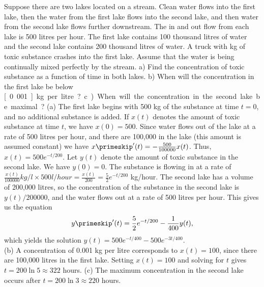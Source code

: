 {Suppose there are two lakes located on a stream.  Clean
water flows into the first lake,
then the water from the first lake flows into the second lake, and then
water from the second lake flows further downstream.
The in and out flow from each lake is 500 litres per hour.
The first lake contains 100 thousand litres of water and the
second lake contains 200 thousand litres of water.
A truck with \unit[500]{kg} of toxic substance
crashes into the first lake.  Assume that the water is being continually
mixed perfectly by the stream.  a) Find the concentration of toxic substance
as a function of time in both lakes.  b) When will the
concentration in the first lake be below \unit[0.001]{kg} per litre?
c) When will the
concentration in the second lake be maximal?}
{(a) The first lake begins with 500 kg of the substance at time $t=0$, and no additional substance is added. If $x(t)$ denotes the amount of toxic substance at time $t$, we have $x(0)=500$. Since water flows out of the lake at a rate of 500 litres per hour, and there are 100,000 in the lake (this amount is assumed constant) we have $x\primeskip'(t) = -\frac{500}{100000}x(t)$. Thus, $x(t) = 500e^{-t/200}$. Let $y(t)$ denote the amount of toxic substance in the second lake. We have $y(0)=0$. The substance is flowing in at a rate of $\frac{x(t)}{100000} kg/l\times 500 l/hour = \frac{x(t)}{200} = \frac{5}{2}e^{-t/200}$ kg/hour. The second lake has a volume of 200,000 litres, so the concentration of the substance in the second lake is $y(t)/200000$, and the water flows out at a rate of 500 litres per hour. This gives us the equation
\[
y\primeskip'(t) = \frac{5}{2}e^{-t/200}-\frac{1}{400}y(t),
\]
which yields the solution $y(t) = 500e^{-t/400}-500e^{-3t/400}$.\\
(b) A concentration of 0.001 kg per litre corresponds to $x(t) = 100$, since there are 100,000 litres in the first lake. Setting $x(t)=100$ and solving for $t$ gives $t=200\ln 5 \approx 322$ hours.
(c) The maximum concentration in the second lake occurs after $t=200\ln 3 \approx 220$ hours.}